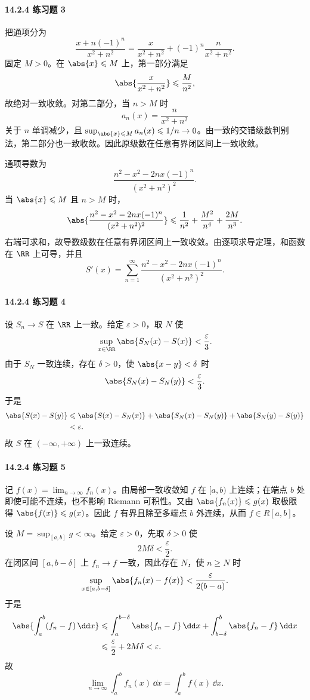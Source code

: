 \paragraph{14.2.4 练习题 3}
\begin{xsolution}
把通项分为
\[
  \frac{x+n(-1)^n}{x^2+n^2}
  =\frac{x}{x^2+n^2}+(-1)^n\frac{n}{x^2+n^2}.
\]
固定 $M>0$。在 $\abs{x}\leqslant M$ 上，第一部分满足
\[
  \abs{\frac{x}{x^2+n^2}}\leqslant\frac{M}{n^2},
\]
故绝对一致收敛。对第二部分，当 $n>M$ 时
\[
  a_n(x)=\frac{n}{x^2+n^2}
\]
关于 $n$ 单调减少，且 $\sup_{\abs{x}\leqslant M}a_n(x)\leqslant1/n\to0$。由一致的交错级数判别法，第二部分也一致收敛。因此原级数在任意有界闭区间上一致收敛。

通项导数为
\[
  \frac{n^2-x^2-2nx(-1)^n}{(x^2+n^2)^2}.
\]
当 $\abs{x}\leqslant M$ 且 $n>M$ 时，
\[
  \abs{\frac{n^2-x^2-2nx(-1)^n}{(x^2+n^2)^2}}
  \leqslant\frac{1}{n^2}+\frac{M^2}{n^4}+\frac{2M}{n^3}.
\]
右端可求和，故导数级数在任意有界闭区间上一致收敛。由逐项求导定理，和函数在 $\RR$ 上可导，并且
\[
  S'(x)=\sum_{n=1}^{\infty}
  \frac{n^2-x^2-2nx(-1)^n}{(x^2+n^2)^2}.
\]
\end{xsolution}

\paragraph{14.2.4 练习题 4}
\begin{xsolution}
设 $S_n\to S$ 在 $\RR$ 上一致。给定 $\varepsilon>0$，取 $N$ 使
\[
  \sup_{x\in\RR}\abs{S_N(x)-S(x)}<\frac\varepsilon3.
\]
由于 $S_N$ 一致连续，存在 $\delta>0$，使 $\abs{x-y}<\delta$ 时
\[
  \abs{S_N(x)-S_N(y)}<\frac\varepsilon3.
\]
于是
\[
\begin{aligned}
  \abs{S(x)-S(y)}
  &\leqslant\abs{S(x)-S_N(x)}+\abs{S_N(x)-S_N(y)}+\abs{S_N(y)-S(y)}\\
  &<\varepsilon.
\end{aligned}
\]
故 $S$ 在 $(-\infty,+\infty)$ 上一致连续。
\end{xsolution}

\paragraph{14.2.4 练习题 5}
\begin{xsolution}
记 $f(x)=\lim_{n\to\infty}f_n(x)$。由局部一致收敛知 $f$ 在 $[a,b)$ 上连续；在端点 $b$ 处即使可能不连续，也不影响 Riemann 可积性。又由 $\abs{f_n(x)}\leqslant g(x)$ 取极限得 $\abs{f(x)}\leqslant g(x)$。因此 $f$ 有界且除至多端点 $b$ 外连续，从而 $f\in R[a,b]$。

设 $M=\sup_{[a,b]}g<\infty$。给定 $\varepsilon>0$，先取 $\delta>0$ 使
\[
  2M\delta<\frac\varepsilon2.
\]
在闭区间 $[a,b-\delta]$ 上 $f_n\to f$ 一致，因此存在 $N$，使 $n\geqslant N$ 时
\[
  \sup_{x\in[a,b-\delta]}\abs{f_n(x)-f(x)}
  <\frac{\varepsilon}{2(b-a)}.
\]
于是
\[
\begin{aligned}
  \abs{\int_a^b(f_n-f)\,\dd x}
  &\leqslant\int_a^{b-\delta}\abs{f_n-f}\,\dd x
  +\int_{b-\delta}^b\abs{f_n-f}\,\dd x\\
  &\leqslant\frac\varepsilon2+2M\delta<\varepsilon.
\end{aligned}
\]
故
\[
  \lim_{n\to\infty}\int_a^b f_n(x)\,\dd x
  =\int_a^b f(x)\,\dd x.
\]
\end{xsolution}

